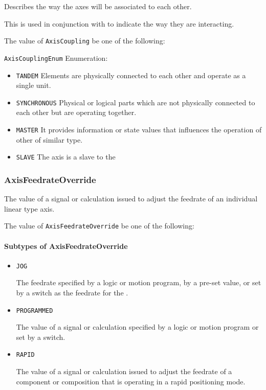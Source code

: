 Describes the way the axes will be associated to each other. 
  
 This is used in conjunction with  to indicate the way they are interacting.


The value of \texttt{AxisCoupling} \MUST be one of the following: 


\texttt{AxisCouplingEnum} Enumeration:

\begin{itemize}
\item \texttt{TANDEM} \newline Elements are physically connected to each other and operate as a single unit. 
\item \texttt{SYNCHRONOUS} \newline Physical or logical parts which are not physically connected to each other but are operating together. 
\item \texttt{MASTER} \newline It provides information or state values that influences the operation of other  of similar type. 
\item \texttt{SLAVE} \newline The axis is a slave to the  
\end{itemize}

\FloatBarrier

\subsubsection{AxisFeedrateOverride}
\label{sec:AxisFeedrateOverride}



The value of a signal or calculation issued to adjust the feedrate of an individual linear type axis.


The value of \texttt{AxisFeedrateOverride} \MUST be one of the following: 

\FloatBarrier

\paragraph{Subtypes of AxisFeedrateOverride}\mbox{}
\label{sec:Subtypes of AxisFeedrateOverride}

\begin{itemize}

\item \texttt{JOG}


The feedrate specified by a logic or motion program, by a pre-set value, or set by a switch as the feedrate for the . 

\item \texttt{PROGRAMMED}


The value of a signal or calculation specified by a logic or motion program or set by a switch.

\item \texttt{RAPID}


The value of a signal or calculation issued to adjust the feedrate of a component or composition that is operating in a rapid positioning mode.


\end{itemize}

